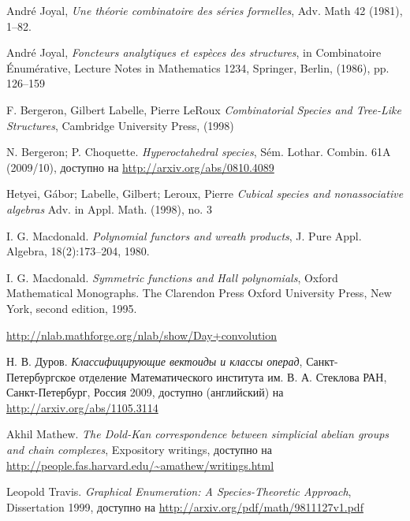 \begin{thebibliography}{9}

 André Joyal, \emph{Une théorie combinatoire des séries
formelles}, Adv. Math 42 (1981), 1–82.

 André Joyal, \emph{Foncteurs analytiques et espèces des
structures}, in Combinatoire Énumérative, Lecture Notes in Mathematics 1234, Springer,
Berlin, (1986), pp. 126–159

 F. Bergeron, Gilbert Labelle, Pierre LeRoux
\emph{Combinatorial Species and Tree-Like Structures}, Cambridge University Press, (1998)

 N. Bergeron; P. Choquette.
\emph{Hyperoctahedral species}, Sém. Lothar. Combin. 61A (2009/10), доступно на
\url{http://arxiv.org/abs/0810.4089}

 Hetyei, Gábor; Labelle, Gilbert;
Leroux, Pierre \emph{Cubical species and nonassociative algebras} Adv. in Appl.
Math. (1998), no. 3

 I. G. Macdonald. \emph{Polynomial functors and wreath
products}, J. Pure Appl. Algebra, 18(2):173–204, 1980.

 I. G. Macdonald. \emph{Symmetric functions and Hall polynomials},
Oxford Mathematical Monographs.
The Clarendon Press Oxford University Press, New York, second edition, 1995.

 \url{http://nlab.mathforge.org/nlab/show/Day+convolution}

 Н. В. Дуров. \emph{Классифицирующие вектоиды и классы операд},
Санкт-Петербургское отделение Математического института им. В. А. Стеклова РАН,
Санкт-Петербург, Россия 2009, доступно (английский) на
\url{http://arxiv.org/abs/1105.3114}

 Akhil Mathew. \emph{The Dold-Kan correspondence between
simplicial abelian groups and chain complexes}, Expository writings, доступно на 
\url{http://people.fas.harvard.edu/~amathew/writings.html}

 Leopold Travis. \emph{Graphical Enumeration: A
Species-Theoretic Approach}, Dissertation 1999, доступно на
\url{http://arxiv.org/pdf/math/9811127v1.pdf}

\end{thebibliography}